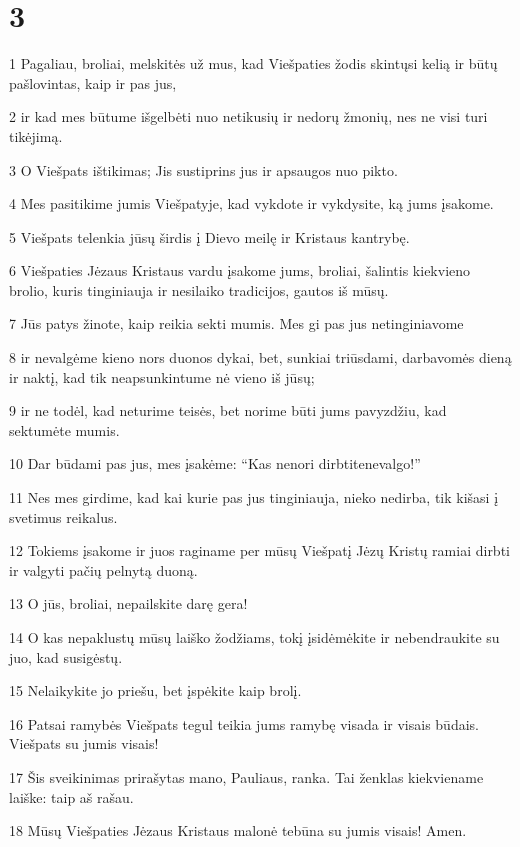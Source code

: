 \chapter{3}


\par 1 Pagaliau, broliai, melskitės už mus, kad Viešpaties žodis skintųsi kelią ir būtų pašlovintas, kaip ir pas jus, 
\par 2 ir kad mes būtume išgelbėti nuo netikusių ir nedorų žmonių, nes ne visi turi tikėjimą. 
\par 3 O Viešpats ištikimas; Jis sustiprins jus ir apsaugos nuo pikto. 
\par 4 Mes pasitikime jumis Viešpatyje, kad vykdote ir vykdysite, ką jums įsakome. 
\par 5 Viešpats telenkia jūsų širdis į Dievo meilę ir Kristaus kantrybę. 
\par 6 Viešpaties Jėzaus Kristaus vardu įsakome jums, broliai, šalintis kiekvieno brolio, kuris tinginiauja ir nesilaiko tradicijos, gautos iš mūsų. 
\par 7 Jūs patys žinote, kaip reikia sekti mumis. Mes gi pas jus netinginiavome 
\par 8 ir nevalgėme kieno nors duonos dykai, bet, sunkiai triūsdami, darbavomės dieną ir naktį, kad tik neapsunkintume nė vieno iš jūsų; 
\par 9 ir ne todėl, kad neturime teisės, bet norime būti jums pavyzdžiu, kad sektumėte mumis. 
\par 10 Dar būdami pas jus, mes įsakėme: “Kas nenori dirbti­tenevalgo!” 
\par 11 Nes mes girdime, kad kai kurie pas jus tinginiauja, nieko nedirba, tik kišasi į svetimus reikalus. 
\par 12 Tokiems įsakome ir juos raginame per mūsų Viešpatį Jėzų Kristų ramiai dirbti ir valgyti pačių pelnytą duoną. 
\par 13 O jūs, broliai, nepailskite darę gera! 
\par 14 O kas nepaklustų mūsų laiško žodžiams, tokį įsidėmėkite ir nebendraukite su juo, kad susigėstų. 
\par 15 Nelaikykite jo priešu, bet įspėkite kaip brolį. 
\par 16 Patsai ramybės Viešpats tegul teikia jums ramybę visada ir visais būdais. Viešpats su jumis visais! 
\par 17 Šis sveikinimas prirašytas mano, Pauliaus, ranka. Tai ženklas kiekviename laiške: taip aš rašau. 
\par 18 Mūsų Viešpaties Jėzaus Kristaus malonė tebūna su jumis visais! Amen.


